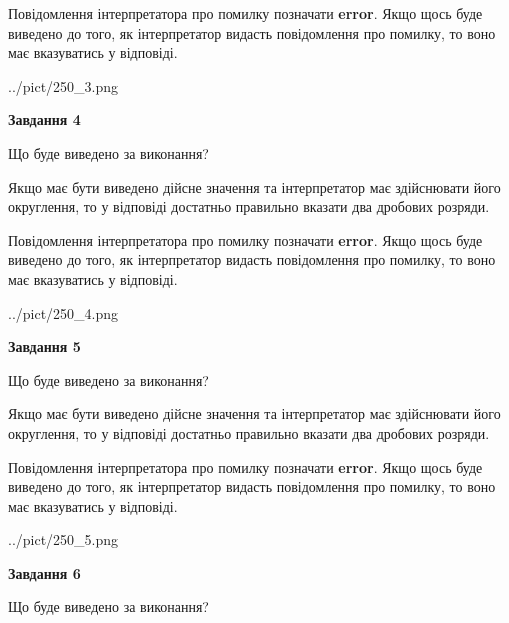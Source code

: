 \documentclass[12pt, ukrainian]{article}
\begin{document}
{\begin {Large}
Повідомлення інтерпретатора про помилку позначати \textbf{error}.
Якщо щось буде виведено до того, як інтерпретатор видасть повідомлення про помилку, 
то воно має вказуватись у відповіді. \par

\begin{center}
	{../pict/250_3.png}
\end{center}
\newpage

{\begin {center}\textbf{Завдання 4}\end {center}}\par
Що буде виведено за виконання? \par

Якщо має бути виведено дійсне значення та інтерпретатор має здійснювати його округлення, 
то у відповіді достатньо правильно вказати два дробових розряди.

Повідомлення інтерпретатора про помилку позначати \textbf{error}.
Якщо щось буде виведено до того, як інтерпретатор видасть повідомлення про помилку, 
то воно має вказуватись у відповіді. \par

\begin{center}
	{../pict/250_4.png}
\end{center}
\newpage

{\begin {center}\textbf{Завдання 5}\end {center}}\par
Що буде виведено за виконання? \par

Якщо має бути виведено дійсне значення та інтерпретатор має здійснювати його округлення, 
то у відповіді достатньо правильно вказати два дробових розряди.

Повідомлення інтерпретатора про помилку позначати \textbf{error}.
Якщо щось буде виведено до того, як інтерпретатор видасть повідомлення про помилку, 
то воно має вказуватись у відповіді. \par

\begin{center}
	{../pict/250_5.png}
\end{center}
\newpage

{\begin {center}\textbf{Завдання 6}\end {center}}\par
Що буде виведено за виконання? \par


\end{Large}}
\end{document}
